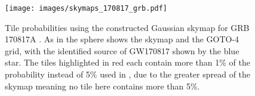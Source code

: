 \begin{colsection}
\begin{colsection}
\begin{figure}[p]
    \begin{center}
        \texttt{[image: images/skymaps\_170817\_grb.pdf]}
    \end{center}
    \caption[Tile probabilities for GRB 170817A]{
        Tile probabilities using the constructed Gaussian skymap for GRB 170817A \citep{GW170817_Fermi}. As in  the sphere shows the skymap and the GOTO-4 grid, with the identified source of GW170817 shown by the blue star. The tiles highlighted in red each contain more than 1\% of the probability instead of 5\% used in , due to the greater spread of the skymap meaning no tile here contains more than 5\%.
    }\label{fig:170817_grb}
\end{figure}

\end{colsection}


\end{colsection}


